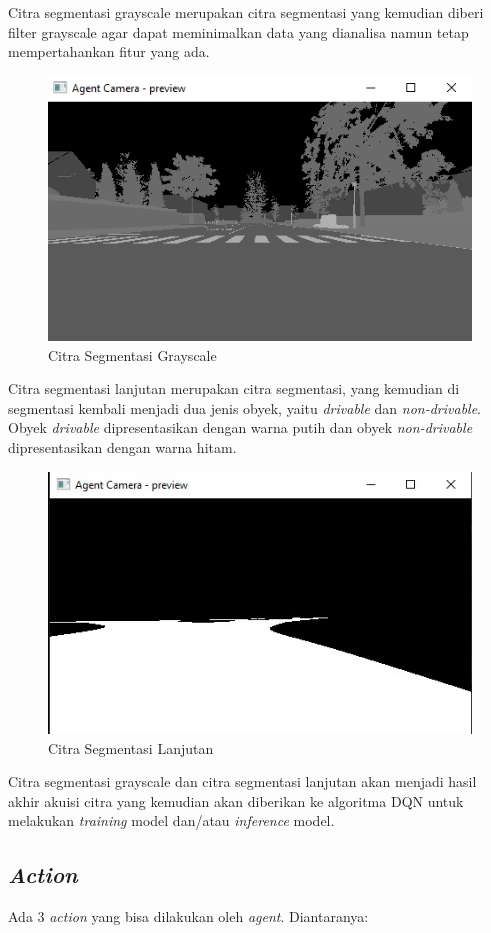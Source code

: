 \documentclass[conference]{IEEEtran}
\begin{document}
Citra segmentasi grayscale merupakan citra segmentasi yang kemudian diberi filter grayscale agar dapat meminimalkan data yang dianalisa namun tetap mempertahankan fitur yang ada.

\begin{figure}[H] 
	\centering
	\includegraphics[width=.7\linewidth]{images/grayscale}
	\caption{Citra Segmentasi Grayscale}
	\label{fig:grayscale}
\end{figure}

Citra segmentasi lanjutan merupakan citra segmentasi, yang kemudian di segmentasi kembali menjadi dua jenis obyek, yaitu \textit{drivable }dan \textit{non-drivable}. Obyek \textit{drivable} dipresentasikan dengan warna putih dan obyek \textit{non-drivable} dipresentasikan dengan warna hitam.

\begin{figure}[H] 
	\centering
	\includegraphics[width=.7\linewidth]{images/segmentasi_hitam_putih}
	\caption{Citra Segmentasi Lanjutan}
	\label{fig:segmentasi_hitam_putih}
\end{figure}

Citra segmentasi grayscale dan citra segmentasi lanjutan akan menjadi hasil akhir akuisi citra yang kemudian akan diberikan ke algoritma DQN untuk melakukan \textit{training} model dan/atau \textit{inference} model.

\subsection{\textit{Action}}
\label{sec:action}
Ada 3 \textit{action} yang bisa dilakukan oleh \textit{agent}. Diantaranya:
\end{document}
